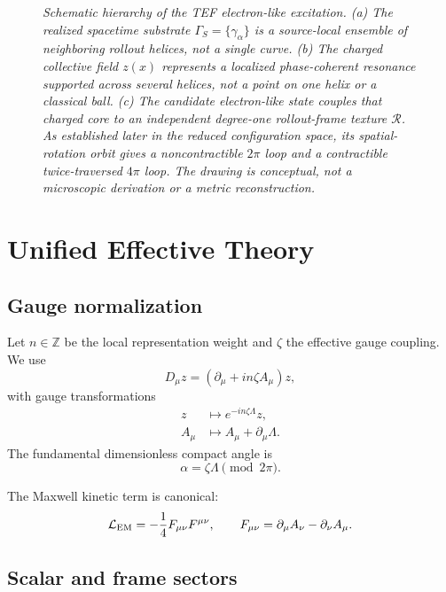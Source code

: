 \documentclass[11pt]{article}
\begin{document}
\begin{figure}[t]
{%
}
\caption{\textit{Schematic hierarchy of the TEF electron-like excitation. (a) The realized spacetime substrate $\Gamma_S=\{\gamma_\alpha\}$ is a source-local ensemble of neighboring rollout helices, not a single curve. (b) The charged collective field $z(x)$ represents a localized phase-coherent resonance supported across several helices, not a point on one helix or a classical ball. (c) The candidate electron-like state couples that charged core to an independent degree-one rollout-frame texture $\mathcal R$. As established later in the reduced configuration space, its spatial-rotation orbit gives a noncontractible $2\pi$ loop and a contractible twice-traversed $4\pi$ loop. The drawing is conceptual, not a microscopic derivation or a metric reconstruction.}}
\label{fig:electron-excitation-hierarchy}
\end{figure}

\section{Unified Effective Theory}

\subsection{Gauge normalization}

Let \(n\in\mathbb Z\) be the local representation weight and \(\zeta\) the effective gauge coupling. We use
\begin{equation}
\boxed{
D_\mu z
=
(\partial_\mu+i n\zeta A_\mu)z,
}
\end{equation}
with gauge transformations
\begin{align}
z&\mapsto e^{-in\zeta\Lambda}z,\\
A_\mu&\mapsto A_\mu+\partial_\mu\Lambda.
\end{align}
The fundamental dimensionless compact angle is
\begin{equation}
\alpha=\zeta\Lambda
\pmod{2\pi}.
\end{equation}

The Maxwell kinetic term is canonical:
\begin{equation}
\mathcal L_{\rm EM}
=
-\frac14F_{\mu\nu}F^{\mu\nu},
\qquad
F_{\mu\nu}
=
\partial_\mu A_\nu-\partial_\nu A_\mu.
\end{equation}

\subsection{Scalar and frame sectors}
\end{document}
